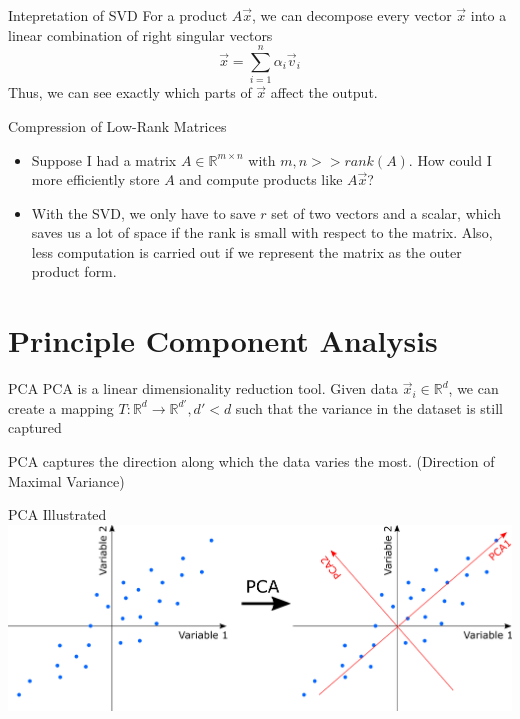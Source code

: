 \documentclass{beamer}
\begin{document}
\begin{frame}{Intepretation of SVD}
For a product $A \vec{x}$, we can decompose every vector $\vec{x}$ into a linear combination of right singular vectors
\[ \vec x = \sum_{i = 1}^n \alpha_i \vec{v}_i \]
Thus, we can see exactly which parts of $\vec{x}$ affect the output.
\end{frame}


\begin{frame}{Compression of Low-Rank Matrices}
\begin{itemize}[<+->]
\item Suppose I had a matrix $A \in \mathbb{R}^{m \times n}$ with $m, n >> rank(A)$. How could I more efficiently store $A$ and compute products like $A \vec{x}$?
\vspace{2em}
\item With the SVD, we only have to save $r$ set of two vectors and a scalar, which saves us a lot of space if the rank is small with respect to the matrix. Also, less computation is carried out if we represent the matrix as the outer product form.
\end{itemize}
\end{frame}

\section[PCA]{Principle Component Analysis}

\begin{frame}{PCA}
PCA is a linear dimensionality reduction tool. Given data $\vec{x}_i \in \mathbb{R}^d$, we can create a mapping $T : \mathbb{R}^d \rightarrow \mathbb{R}^{d'}, d' < d$ such that the variance in the dataset is still captured

PCA captures the direction along which the data varies the most. (Direction of Maximal Variance)
\end{frame}
\begin{frame}{PCA Illustrated}
\includegraphics[scale=0.4]{images/PCAexample.png}
\end{frame}
\end{document}
